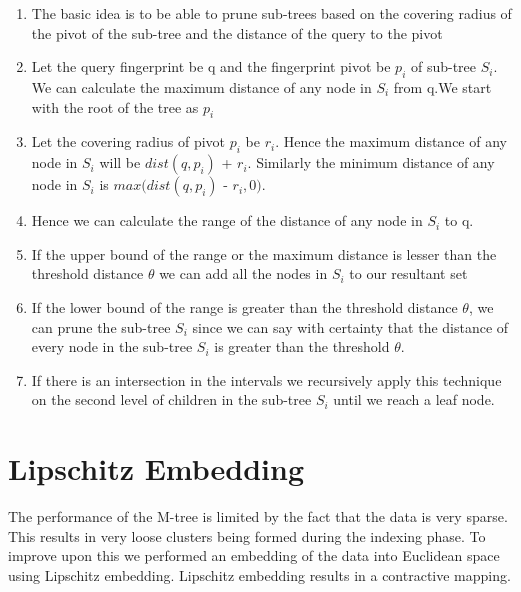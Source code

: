 \begin{enumerate}
	\item The basic idea is to be able to prune sub-trees based on the covering radius of the pivot of the sub-tree and the distance of the query to the pivot
	 
	\item Let the query fingerprint be q and the fingerprint pivot be $p_i$ of sub-tree $S_i$. We can calculate the maximum distance of any node in $S_i$ from q.We start with the root of the tree as $p_i$
	
	\item Let the covering radius of pivot $p_i$ be $r_i$. Hence the maximum distance of any node in $S_i$ will be $dist(q,p_i)$ + $r_i$. Similarly the minimum distance of any node in $S_i$ is $max(dist(q,p_i)$ - $r_i, 0)$. 
	
	\item Hence we can calculate the range of the distance of any node in $S_i$ to q. 
	
	\item  If the upper bound of the range or the maximum distance is lesser than the threshold distance $\theta$ we can add all the nodes in $S_i$ to our resultant set
	
	\item If the lower bound of the range is greater than the threshold distance $\theta$, we can prune the sub-tree $S_i$ since we can say with certainty that the distance of every node in the sub-tree $S_i$ is greater than  the threshold $\theta$.
	
	\item If there is an intersection in the intervals we recursively apply this technique on the second level of children in the sub-tree $S_i$ until we reach a leaf node.
	
\end{enumerate}



\section{Lipschitz Embedding}

The performance of the M-tree is limited by the fact that the data is very sparse. This results in very loose clusters being formed during the indexing phase. To improve upon this we performed an embedding of the data into Euclidean space using Lipschitz embedding. Lipschitz embedding results in a contractive mapping.\\

